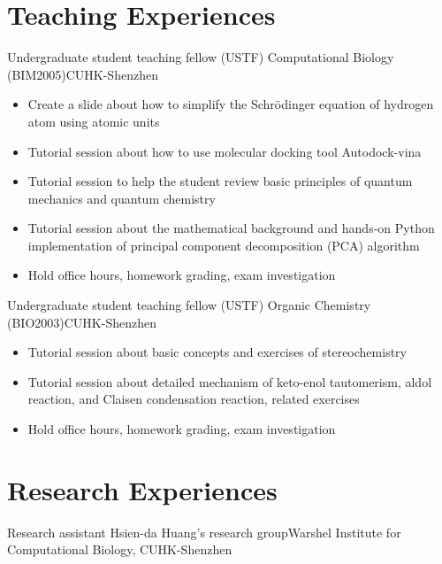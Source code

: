 \documentclass[12pt,a4paper,sans]{moderncv}
\newcommand{\cvsection}[1]{\section{{#1}}}
\begin{document}
\cvsection{Teaching Experiences}
{Undergraduate student teaching fellow (USTF)}{}
{Computational Biology (BIM2005)}{CUHK-Shenzhen}
{
    \begin{itemize}[itemsep=4pt]
        \item Create a slide about how to simplify the Schrödinger equation of hydrogen atom using
        atomic units
        \item Tutorial session about how to use molecular docking tool Autodock-vina
        \item Tutorial session to help the student review basic principles of quantum mechanics and quantum chemistry
        \item Tutorial session about the mathematical background and hands-on Python implementation of principal component decomposition (PCA) algorithm
        \item Hold office hours, homework grading, exam investigation
    \end{itemize}
}

        
\vspace{0.5em}
{Undergraduate student teaching fellow (USTF)}{}
{Organic Chemistry (BIO2003)}{CUHK-Shenzhen}
{
    \begin{itemize}[itemsep=4pt]
        \item Tutorial session about basic concepts and exercises of stereochemistry
        \item Tutorial session about detailed mechanism of keto-enol tautomerism, aldol reaction,
        and Claisen condensation reaction, related exercises
        \item Hold office hours, homework grading, exam investigation
    \end{itemize}
}




\cvsection{Research Experiences}
{Research assistant}{}
{Hsien-da Huang's research group}{Warshel Institute
for Computational Biology, CUHK-Shenzhen
}
{}
\end{document}
